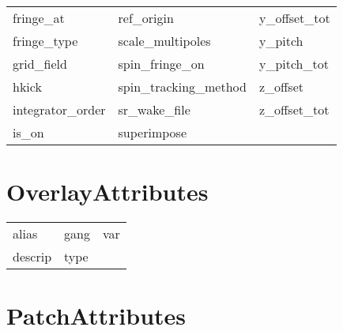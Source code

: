 \begin{tabular}{lll}
fringe_at                   & ref_origin                  & y_offset_tot                \\
fringe_type                 & scale_multipoles            & y_pitch                     \\
grid_field                  & spin_fringe_on              & y_pitch_tot                 \\
hkick                       & spin_tracking_method        & z_offset                    \\
integrator_order            & sr_wake_file                & z_offset_tot                \\
is_on                       & superimpose                 &                             \\
 \bottomrule
 \end{tabular}
 \vfill
 
 \section{OverlayAttributes}
 \label{s:list.overlay}
 
 \begin{tabular}{lll} \toprule
alias                       & gang                        & var                         \\
descrip                     & type                        &                             \\
 \bottomrule
 \end{tabular}
 \vfill
 
 \section{PatchAttributes}
 \label{s:list.patch}
 
